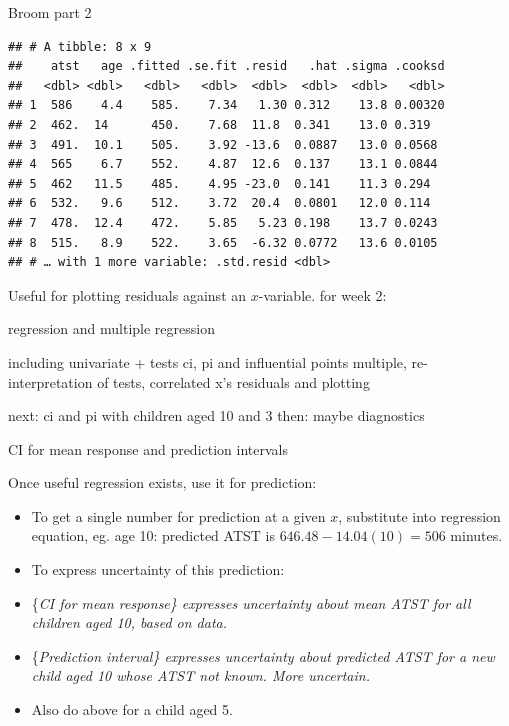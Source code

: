 \documentclass[ignorenonframetext,]{beamer}
\newenvironment{Shaded}{\begin{snugshade}}{\end{snugshade}}
\newcommand{\DecValTok}[1]{\textcolor[rgb]{0.00,0.00,0.81}{#1}}
\newcommand{\FloatTok}[1]{\textcolor[rgb]{0.00,0.00,0.81}{#1}}
\newcommand{\KeywordTok}[1]{\textcolor[rgb]{0.13,0.29,0.53}{\textbf{#1}}}
\newcommand{\NormalTok}[1]{#1}
\newcommand{\OperatorTok}[1]{\textcolor[rgb]{0.81,0.36,0.00}{\textbf{#1}}}
\newcommand{\StringTok}[1]{\textcolor[rgb]{0.31,0.60,0.02}{#1}}
\begin{document}
\begin{frame}[fragile]{Broom part 2}
\protect\hypertarget{broom-part-2}{}

\begin{Shaded}
\end{Shaded}

\begin{verbatim}
## # A tibble: 8 x 9
##    atst   age .fitted .se.fit .resid   .hat .sigma .cooksd
##   <dbl> <dbl>   <dbl>   <dbl>  <dbl>  <dbl>  <dbl>   <dbl>
## 1  586    4.4    585.    7.34   1.30 0.312    13.8 0.00320
## 2  462.  14      450.    7.68  11.8  0.341    13.0 0.319  
## 3  491.  10.1    505.    3.92 -13.6  0.0887   13.0 0.0568 
## 4  565    6.7    552.    4.87  12.6  0.137    13.1 0.0844 
## 5  462   11.5    485.    4.95 -23.0  0.141    11.3 0.294  
## 6  532.   9.6    512.    3.72  20.4  0.0801   12.0 0.114  
## 7  478.  12.4    472.    5.85   5.23 0.198    13.7 0.0243 
## 8  515.   8.9    522.    3.65  -6.32 0.0772   13.6 0.0105 
## # … with 1 more variable: .std.resid <dbl>
\end{verbatim}

Useful for plotting residuals against an \(x\)-variable. for week 2:

regression and multiple regression

including univariate + tests ci, pi and influential points multiple,
re-interpretation of tests, correlated x's residuals and plotting

next: ci and pi with children aged 10 and 3 then: maybe diagnostics

\end{frame}

\begin{frame}{CI for mean response and prediction intervals}
\protect\hypertarget{ci-for-mean-response-and-prediction-intervals}{}

Once useful regression exists, use it for prediction:

\begin{itemize}
\item
  To get a single number for prediction at a given \(x\), substitute
  into regression equation, eg. age 10: predicted ATST is
  \(646.48-14.04(10)=506\) minutes.
\item
  To express uncertainty of this prediction:
\item
  \{\em CI for mean response\} expresses uncertainty about mean ATST for
  all children aged 10, based on data.
\item
  \{\em Prediction interval\} expresses uncertainty about predicted ATST
  for a new child aged 10 whose ATST not known. More uncertain.
\item
  Also do above for a child aged 5.
\end{itemize}

\end{frame}
\end{document}
